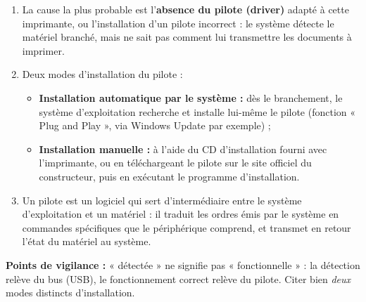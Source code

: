 \documentclass[11pt]{article}
\newcommand{\cle}[1]{{\popxbold\color{popdark}#1}}
\begin{document}
\begin{corrige}
\begin{enumerate}
\item La cause la plus probable est l'\textbf{absence du pilote (driver)} adapté à cette imprimante, ou l'installation d'un pilote incorrect : le système détecte le matériel branché, mais ne sait pas comment lui transmettre les documents à imprimer.
\item Deux modes d'installation du pilote :
\begin{itemize}
\item \textbf{Installation automatique par le système :} dès le branchement, le système d'exploitation recherche et installe lui-même le pilote (fonction « Plug and Play », via Windows Update par exemple) ;
\item \textbf{Installation manuelle :} à l'aide du CD d'installation fourni avec l'imprimante, ou en téléchargeant le pilote sur le site officiel du constructeur, puis en exécutant le programme d'installation.
\end{itemize}
\item Un pilote est un logiciel qui sert d'\cle{intermédiaire} entre le système d'exploitation et un matériel : il traduit les ordres émis par le système en commandes spécifiques que le périphérique comprend, et transmet en retour l'état du matériel au système.
\end{enumerate}
\textbf{Points de vigilance :} « détectée » ne signifie pas « fonctionnelle » : la détection relève du bus (USB), le fonctionnement correct relève du pilote. Citer bien \emph{deux} modes distincts d'installation.
\end{corrige}
\end{document}
